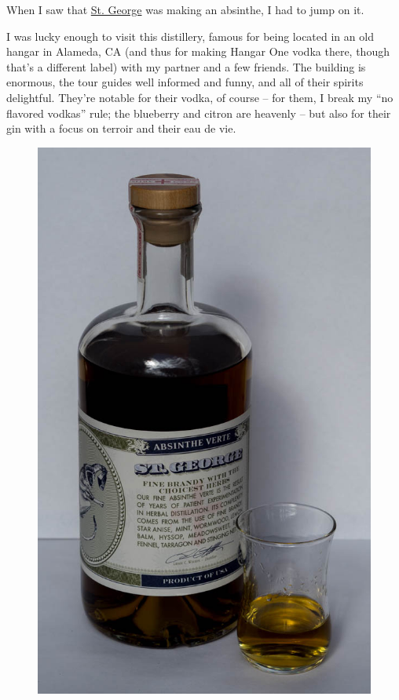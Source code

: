 \documentclass[12pt,letterpaper,oneside]{memoir}
\begin{document}
  When I saw that \href{http://www.stgeorgespirits.com/}{St. George} was making an absinthe, I had to jump on it.

  I was lucky enough to visit this distillery, famous for being located in an old hangar in Alameda, CA (and thus for making Hangar One vodka there, though that's a different label) with my partner and a few friends.  The building is enormous, the tour guides well informed and funny, and all of their spirits delightful.  They're notable for their vodka, of course -- for them, I break my  ``no flavored vodkas'' rule; the blueberry and citron are heavenly -- but also for their gin with a focus on terroir and their eau de vie.

  \begin{figure}
    \includegraphics[width=\linewidth]{../../assets/tasting/naa-st-george.jpg}
  \end{figure}
\end{document}
